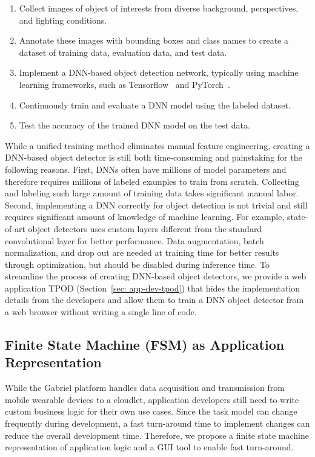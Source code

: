 \begin{enumerate}
  \item Collect images of object of interests from diverse background,
  perspectives, and lighting conditions.
  \item Annotate these images with bounding boxes and class names to create a
  dataset of training data, evaluation data, and test data.
  \item Implement a DNN-based object detection network, typically using machine learning frameworks,
  such as Tensorflow~\cite{abadi2016tensorflow} and
  PyTorch~\cite{paszke2019pytorch}.
  \item Continuously train and evaluate a DNN model using the labeled dataset.
  \item Test the accuracy of the trained DNN model on the test data.
\end{enumerate}

While a unified training method eliminates manual feature engineering, creating
a DNN-based object detector is still both time-consuming and painstaking for the
following reasons. First, DNNs often have millions of model parameters and
therefore requires millions of labeled examples to train from scratch.
Collecting and labeling such large amount of training data takes significant
manual labor. Second, implementing a DNN correctly for object detection is not
trivial and still requires significant amount of knowledge of machine learning.
For example, state-of-art object detectors uses custom layers different from the
standard convolutional layer for better performance. Data augmentation, batch
normalization, and drop out are needed at training time for better results
through optimization, but should be disabled during inference time. To
streamline the process of creating DNN-based object detectors, we provide a web
application TPOD (Section~\ref{sec: app-dev-tpod}) that hides the implementation
details from the developers and allow them to train a DNN object detector from a
web browser without writing a single line of code.

\subsection{Finite State Machine (FSM) as Application Representation}
\label{sec: app-dev-fsm-representation}

While the Gabriel platform handles data acquisition and transmission from mobile
wearable devices to a cloudlet, application developers still need to write
custom business logic for their own use cases. Since the task model can change
frequently during development, a fast turn-around time to implement changes can
reduce the overall development time. Therefore, we propose a finite state
machine representation of application logic and a GUI tool to enable fast
turn-around. 

